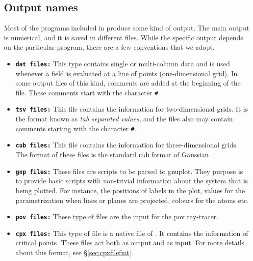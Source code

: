 \subsection{Output names}

Most of the programs included in \DTK{} produce some kind of output. The main output is numerical, and it is saved in different files. While the specific output depends on the particular program, there are a few conventions that we adopt. 

\begin{itemize}
   \item \texttt{\textbf{dat files:}} This type contains single or multi-column data and is used whenever a field is evaluated at a line of points (one-dimensional grid). In some output files of this kind, comments are added at the beginning of the file. These comments start with the character \texttt{\#}.
   \item \texttt{\textbf{tsv files:}} This file contains the information for two-dimensional grids. It is the format known as \textit{tab separated values}, and the files also may contain comments starting with the character \texttt{\#}.
   \item \texttt{\textbf{cub files:}} This file contains the information for three-dimensional grids. The format of these files is the standard \texttt{cub} format of Gaussian \cite{bib:gaussian09}.
   \item \texttt{\textbf{gnp files:}} These files are scripts to be parsed to gnuplot. They purpose is to provide basic scripts with non-trivial information about the system that is being plotted. For instance, the positions of labels in the plot, values for the parametrization when lines or planes are projected, colours for the atoms etc.
   \item \texttt{\textbf{pov files:}} These type of files are the input for the pov ray-tracer.
   \item \texttt{\textbf{cpx files:}} This type of file is a native file of \DTK. It contains the information of critical points. These files act both as output and as input. For more details about this format, see \S\ref{sec:cpxfilefmt}.
\end{itemize}

